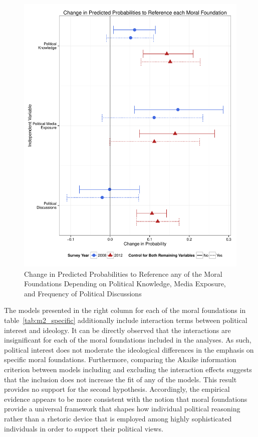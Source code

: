 \documentclass[12pt]{article}
\begin{document}
\begin{figure}\centering
\includegraphics[scale=.4]{../calc/fig/m3_learn.pdf}
\caption{Change in Predicted Probabilities to Reference any of the Moral Foundations Depending on Political Knowledge, Media Exposure, and Frequency of Political Discussions}\label{fig:m3_learn}
\end{figure}

The models presented in the right column for each of the moral foundations in table~\ref{tab:m2_specific} additionally include interaction terms between political interest and ideology. It can be directly observed that the interactions are insignificant for each of the moral foundations included in the analyses. As such, political interest does not moderate the ideological differences in the emphasis on specific moral foundations. Furthermore, comparing the Akaike information criterion between models including and excluding the interaction effects suggests that the inclusion does not increase the fit of any of the models. This result provides no support for the second hypothesis. Accordingly, the empirical evidence appears to be more consistent with the notion that moral foundations provide a universal framework that shapes how individual political reasoning rather than a rhetoric device that is employed among highly sophisticated individuals in order to support their political views.
\end{document}
